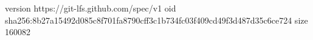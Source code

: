 version https://git-lfs.github.com/spec/v1
oid sha256:8b27a15492d085c8f701fa8790cff3c1b734fc03f409cd49f3d487d35c6ce724
size 160082
